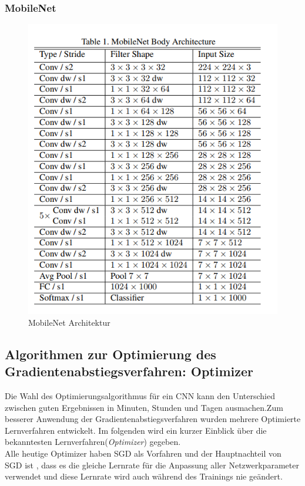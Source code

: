 \documentclass[12pt,a4paper]{scrartcl}
\numberwithin{equation}{section}
\begin{document}
\subsubsection{MobileNet}
\begin{figure}[h]
	\centering
	\includegraphics[width=\textwidth,height=0.8\linewidth]{MobileNet}
	\caption{ MobileNet Architektur }
	\label{fig:MobileNet}
\end{figure}



\subsection{Algorithmen zur Optimierung des Gradientenabstiegsverfahren:	Optimizer}\label{Optimizer}
Die Wahl des Optimierungsalgorithmus für ein \ac{CNN} kann den Unterschied zwischen guten Ergebnissen in Minuten, Stunden und Tagen ausmachen.Zum besserer Anwendung der Gradientenabstiegsverfahren wurden mehrere Optimierte Lernverfahren entwickelt. Im folgenden wird ein kurzer Einblick über die bekanntesten Lernverfahren(\textit{Optimizer})  gegeben.\\
Alle heutige Optimizer haben SGD als Vorfahren und der Hauptnachteil von SGD ist , dass es die gleiche Lernrate für die Anpassung aller Netzwerkparameter verwendet und diese Lernrate wird auch während des Trainings nie geändert. 
\end{document}
